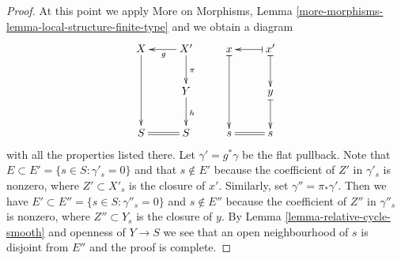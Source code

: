 \documentclass{stacks-project}
\theoremstyle{plain}
\theoremstyle{definition}
\theoremstyle{remark}
\numberwithin{equation}{subsection}
\begin{document}
\begin{proof}
\medskip\noindent
At this point we apply More on Morphisms, Lemma
\ref{more-morphisms-lemma-local-structure-finite-type}
and we obtain a diagram
$$
\xymatrix{
X \ar[dd] & X' \ar[l]^g \ar[d]^\pi & x \ar@{|->}[dd] &
x' \ar@{|->}[l]  \ar@{|->}[d] \\
& Y \ar[d]^h & & y \ar@{|->}[d] \\
S \ar@{=}[r] & S & s & s \ar@{=}[l]
}
$$
with all the properties listed there. Let $\gamma' = g^*\gamma$
be the flat pullback. Note that $E \subset E' = \{s \in S: \gamma'_s = 0\}$
and that $s \not \in E'$ because the coefficient of $Z'$ in $\gamma'_s$
is nonzero, where $Z' \subset X'_s$ is the closure of $x'$.
Similarly, set $\gamma'' = \pi_*\gamma'$. Then we have
$E' \subset E'' = \{s \in S: \gamma''_s = 0\}$ and $s \not \in E''$
because the coefficient of $Z''$ in $\gamma''_s$ is nonzero, where
$Z'' \subset Y_s$ is the closure of $y$. By
Lemma \ref{lemma-relative-cycle-smooth} and openness of $Y \to S$
we see that an open neighbourhood of $s$ is disjoint from $E''$
and the proof is complete.
\end{proof}
\end{document}

